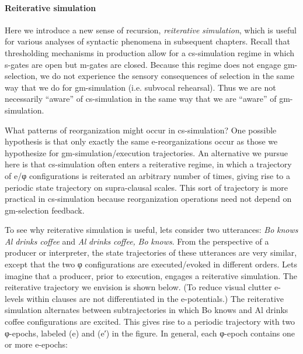 \paragraph{Reiterative simulation}

Here we introduce a new sense of recursion, \textit{reiterative} \textit{simulation}, which is useful for various analyses of syntactic phenomena in subsequent chapters. Recall that thresholding mechanisms in production allow for a cs-simulation regime in which s-gates are open but m-gates are closed. Because this regime does not engage gm-selection, we do not experience the sensory consequences of selection in the same way that we do for gm-simulation (i.e. subvocal rehearsal). Thus we are not necessarily “aware” of cs-simulation in the same way that we are “aware” of gm-simulation.

  What patterns of reorganization might occur in cs-simulation? One possible hypothesis is that only exactly the same e-reorganizations occur as those we hypothesize for gm-simulation/execution trajectories. An alternative we pursue here is that cs-simulation often enters a reiterative regime, in which a trajectory of e/φ configurations is reiterated an arbitrary number of times, giving rise to a periodic state trajectory on supra-clausal scales. This sort of trajectory is more practical in cs-simulation because reorganization operations need not depend on gm-selection feedback.

  To see why reiterative simulation is useful, lets consider two utterances: \textit{Bo} \textit{knows} \textit{Al} \textit{drinks} \textit{coffee} and \textit{Al} \textit{drinks} \textit{coffee,} \textit{Bo} \textit{knows}. From the perspective of a producer or interpreter, the state trajectories of these utterances are very similar, except that the two φ configurations are executed/evoked in different orders. Lets imagine that a producer, prior to execution, engages a reiterative simulation. The reiterative trajectory we envision is shown below. (To reduce visual clutter e-levels within clauses are not differentiated in the e-potentials.) The reiterative simulation alternates between subtrajectories in which {\textbar}Bo knows{\textbar} and {\textbar}Al drinks coffee{\textbar} configurations are excited. This gives rise to a periodic trajectory with two φ-epochs,  labeled (e) and (e′) in the figure. In general, each φ-epoch contains one or more e-epochs:


